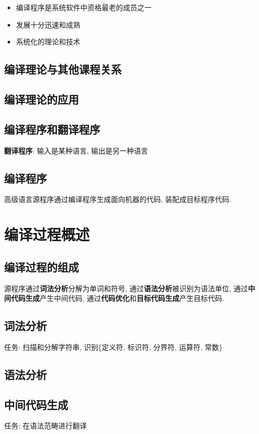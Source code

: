         \begin{itemize}
            \item 编译程序是系统软件中资格最老的成员之一
            \item 发展十分迅速和成熟
            \item 系统化的理论和技术
        \end{itemize}


    \subsection{编译理论与其他课程关系}

    \subsection{编译理论的应用}

    \subsection{编译程序和翻译程序}

        \textbf{翻译程序}: 输入是某种语言, 输出是另一种语言

    \subsection{编译程序}

        高级语言源程序通过编译程序生成面向机器的代码, 装配成目标程序代码.

\section{编译过程概述}

    \subsection{编译过程的组成}

        源程序通过\textbf{词法分析}分解为单词和符号, 通过\textbf{语法分析}被识别为语法单位, 通过\textbf{中间代码生成}产生中间代码, 通过\textbf{代码优化}和\textbf{目标代码生成}产生目标代码.

    \subsection{词法分析}

        任务: 扫描和分解字符串, 识别\{定义符, 标识符, 分界符, 运算符, 常数\}

    \subsection{语法分析}

    \subsection{中间代码生成}

        任务: 在语法范畴进行翻译
